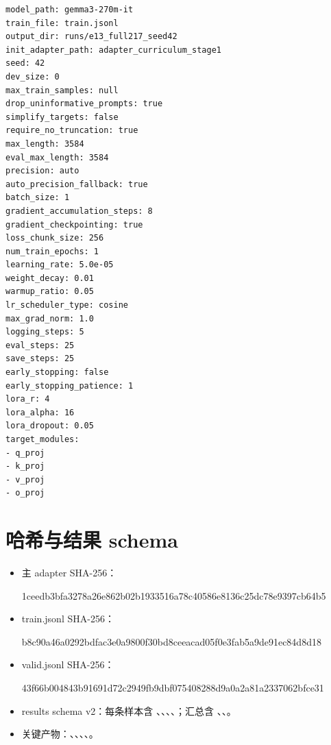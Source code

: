 \documentclass[UTF8,a4paper,zihao=5,fontset=none]{ctexart}
\begin{document}
\begin{lstlisting}[style=reportcode]
model_path: gemma3-270m-it
train_file: train.jsonl
output_dir: runs/e13_full217_seed42
init_adapter_path: adapter_curriculum_stage1
seed: 42
dev_size: 0
max_train_samples: null
drop_uninformative_prompts: true
simplify_targets: false
require_no_truncation: true
max_length: 3584
eval_max_length: 3584
precision: auto
auto_precision_fallback: true
batch_size: 1
gradient_accumulation_steps: 8
gradient_checkpointing: true
loss_chunk_size: 256
num_train_epochs: 1
learning_rate: 5.0e-05
weight_decay: 0.01
warmup_ratio: 0.05
lr_scheduler_type: cosine
max_grad_norm: 1.0
logging_steps: 5
eval_steps: 25
save_steps: 25
early_stopping: false
early_stopping_patience: 1
lora_r: 4
lora_alpha: 16
lora_dropout: 0.05
target_modules:
- q_proj
- k_proj
- v_proj
- o_proj
\end{lstlisting}

\section{哈希与结果 schema}

\begin{itemize}
  \item 主 adapter SHA-256：\par{\footnotesize\ttfamily 1ceedb3bfa3278a26e862b02b1933516a78c40586e8136c25dc78e9397cb64b5\par}
  \item train.jsonl SHA-256：\par{\footnotesize\ttfamily b8c90a46a0292bdfac3e0a9800f30bd8ceeacad05f0e3fab5a9de91ec84d8d18\par}
  \item valid.jsonl SHA-256：\par{\footnotesize\ttfamily 43f66b004843b91691d72c2949fb9dbf075408288d9a0a2a81a2337062bfce31\par}
  \item results schema v2：每条样本含 、、、、；汇总含 、、。
  \item 关键产物：、、、、。
\end{itemize}
\end{document}
